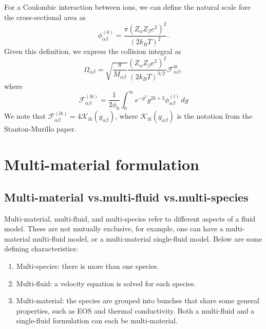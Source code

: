 \documentclass[a4paper,11pt]{report}
\begin{document}
For a Coulombic interaction between ions, we can define the natural scale fore the cross-sectional area as
\begin{equation}
    \phi^{(0)}_{\alpha \beta} = \frac{ \pi \left (Z_\alpha Z_\beta e^2 \right)^2}{ \left(2 k_B T\right)^2}.
\end{equation}
Given this definition, we express the collision integral as
\begin{equation}
    \Omega_{\alpha \beta} = \sqrt{ \frac{\pi }{M_{\alpha \beta}}} \frac{( Z_\alpha Z_\beta e^2)^2 }{(2 k_B T )^{3/2}} \mathcal{F}^{lk}_{\alpha \beta},
\end{equation}
where
\begin{equation}
    \mathcal{F}^{(lk)}_{\alpha \beta} = \frac{1}{2 \phi_0} \int_0^\infty e^{-g^2} g^{2k+3} \phi_{\alpha \beta}^{(l)} \, dg
\end{equation}
We note that $\mathcal{F}^{(lk)}_{\alpha \beta} = 4 \mathcal{K}_{lk}(g_{\alpha \beta})$, where $\mathcal{K}_{lk}(g_{\alpha \beta})$ is the notation from the Stanton-Murillo paper.

\chapter{Multi-material formulation}

\section{Multi-material vs.\@ multi-fluid vs.\@ multi-species}
Multi-material, multi-fluid, and multi-species refer to different aspects of a fluid model. These are not mutually exclusive, for example, one can have a multi-material multi-fluid model, or a multi-material single-fluid model. Below are some defining characteristics:
\begin{enumerate}
    \item Multi-species: there is more than one species.
    \item Multi-fluid: a velocity equation is solved for each species. 
    \item Multi-material: the species are grouped into bunches that share some general properties, such as EOS and thermal conductivity. Both a multi-fluid and a single-fluid formulation can each be multi-material. 
\end{enumerate}
\end{document}
